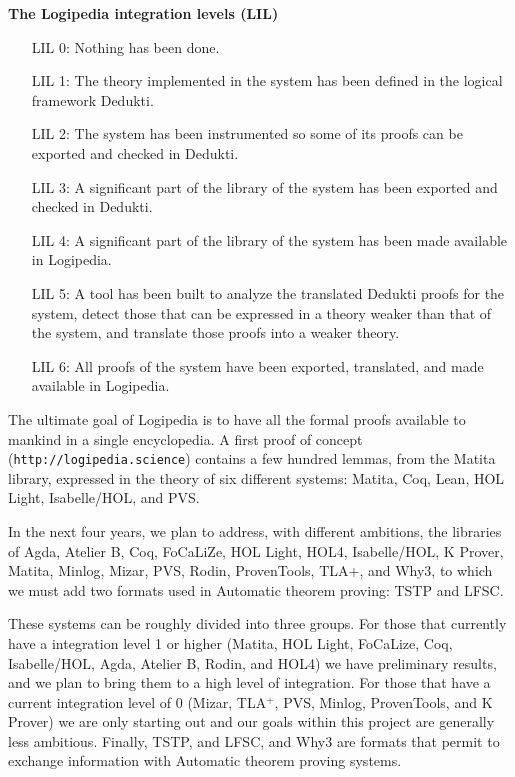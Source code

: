 \begin{framed}
  \vspace{-0.5cm}
\begin{center}
{\bf \Large The Logipedia integration levels (LIL)\label{lil}}
\end{center}

\begin{itemize}
\item[LIL 0:] Nothing has been done.

\item[LIL 1:] The theory implemented in the system has been defined in
  the logical framework Dedukti.

\item[LIL 2:] The system has been instrumented so some of its proofs
  can be exported and checked in Dedukti.

\item[LIL 3:] A significant part of the library of the system has been
  exported and checked in Dedukti.

\item[LIL 4:] A significant part of the library of the system has
  been made available in Logipedia.

\item[LIL 5:] A tool has been built to analyze the translated Dedukti proofs
  for the system, detect those that can be expressed in a theory
  weaker than that of the system, and translate those proofs into a
  weaker theory.

\item[LIL 6:] All proofs of the system have been exported, translated,
  and made available in Logipedia.
\end{itemize}
\end{framed}

The ultimate goal of Logipedia is to have all the formal proofs
available to mankind in a single encyclopedia.  A first proof of
concept ({\tt http://logipedia.science}) contains a few hundred
lemmas, from the Matita library, expressed in the theory of six
different systems: Matita, Coq, Lean, HOL Light, Isabelle/HOL, and
PVS.

In the next four years, we plan to address, with different ambitions,
the libraries of Agda, Atelier B, Coq, FoCaLiZe, HOL Light, HOL4,
Isabelle/HOL, K Prover, Matita, Minlog, Mizar, PVS, Rodin,
ProvenTools, TLA+, and Why3, to which we must add two formats used in
Automatic theorem proving: TSTP and LFSC.

These systems can be roughly divided into three groups.  For those
that currently have a integration level 1 or higher (Matita, HOL
Light, FoCaLize, Coq, Isabelle/HOL, Agda, Atelier B, Rodin, and HOL4)
we have preliminary results, and we plan to bring them to a high level
of integration.  For those that have a current integration level of 0
(Mizar, TLA$^+$, PVS, Minlog, ProvenTools, and K Prover) we are only
starting out and our goals within this project are generally less
ambitious. Finally, TSTP, and LFSC, and Why3 are formats that permit
to exchange information with Automatic theorem proving systems.

